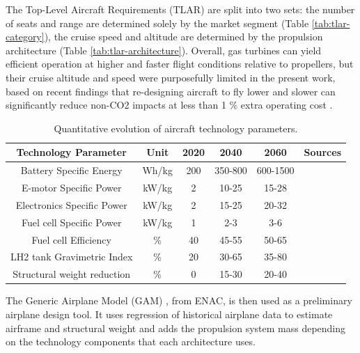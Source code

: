 \documentclass[
]{kaohandt}
\begin{document}
The Top-Level Aircraft Requirements (TLAR) are split into two sets: the number of seats and range are determined solely by the market segment (Table \ref{tab:tlar-category}), the cruise speed and altitude are determined by the propulsion architecture (Table \ref{tab:tlar-architecture}). Overall, gas turbines can yield efficient operation at higher and faster flight conditions relative to propellers, but their cruise altitude and speed were purposefully limited in the present work, based on recent findings that re-designing aircraft to fly lower and slower can significantly reduce non-CO2 impacts at less than 1 \% extra operating cost .

\begin{table}[t!]
    \caption{Quantitative evolution of aircraft technology parameters.}
    \centering
    \begin{tabular}{c|c|c c c|c}
    \toprule
    Technology Parameter & Unit  & 2020 & 2040    & 2060     & Sources   \\
    \midrule
    Battery Specific Energy     & Wh/kg & 200  & 350-800 & 600-1500 & \cite{iata_tech_2050, icct_electric, felder_nasa_2015, bradley_subsonic_2015, woodworth_nasas_nodate} \\
    E-motor Specific Power      & kW/kg & 2    & 10-25   & 15-28 & \cite{ati_electrical, papathakis_nasa_2017} \\
    Electronics Specific Power  & kW/kg & 2    & 15-25   & 20-32 & \cite{ati_electrical, woodworth_nasas_nodate} \\
    Fuel cell Specific Power    & kW/kg & 1    & 2-3     & 3-6 & \cite{iata_tech_2050, ati_fuelcell, papathakis_nasa_2017, wallington_green_2024} \\
    Fuel cell Efficiency        & \%    & 40  & 45-55   & 50-65 & \cite{ati_fuelcell, wallington_green_2024} \\
    LH2 tank Gravimetric Index  & \%    & 20   & 30-65   & 35-80 & \cite{iata_tech_2050, ati_cryogenic, icct_hydrogen, icct_fuelcell, wallington_green_2024} \\
    Structural weight reduction & \%    & 0    & 15-30   & 20-40 & \cite{iata_tech_2050, ati_aerodynamic} \\
    \bottomrule
    \end{tabular}
    \label{tab:aircraft-tech}
\end{table}

The Generic Airplane Model (GAM) , from ENAC, is then used as a preliminary airplane design tool. It uses regression of historical airplane data to estimate airframe and structural weight and adds the propulsion system mass depending on the technology components that each architecture uses.
\end{document}
